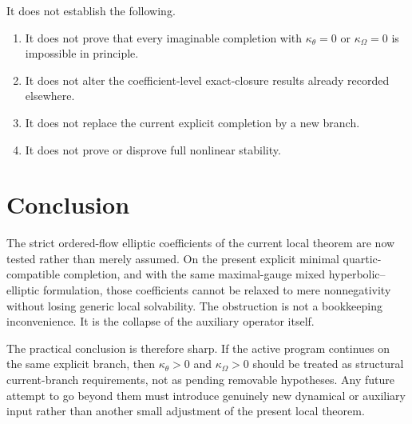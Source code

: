 \documentclass[11pt]{article}
\begin{document}
It does not establish the following.
\begin{enumerate}
    \item It does not prove that every imaginable completion with \(\kappa_\theta=0\) or \(\kappa_\Omega=0\) is impossible in principle.
    \item It does not alter the coefficient-level exact-closure results already recorded elsewhere.
    \item It does not replace the current explicit completion by a new branch.
    \item It does not prove or disprove full nonlinear stability.
\end{enumerate}

\section{Conclusion}

The strict ordered-flow elliptic coefficients of the current local theorem are now tested rather than merely assumed. On the present explicit minimal quartic-compatible completion, and with the same maximal-gauge mixed hyperbolic--elliptic formulation, those coefficients cannot be relaxed to mere nonnegativity without losing generic local solvability. The obstruction is not a bookkeeping inconvenience. It is the collapse of the auxiliary operator itself.

The practical conclusion is therefore sharp. If the active program continues on the same explicit branch, then \(\kappa_\theta>0\) and \(\kappa_\Omega>0\) should be treated as structural current-branch requirements, not as pending removable hypotheses. Any future attempt to go beyond them must introduce genuinely new dynamical or auxiliary input rather than another small adjustment of the present local theorem.
\end{document}
